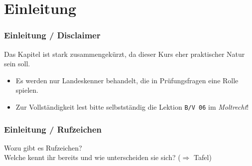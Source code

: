 

\subtitle{Betriebstechnik/Vorschriften 06: \\
          Rufzeichen - Landeskenner \\[2em]}
\date{Stand 19.11.2015}



\section{Einleitung}

\begin{frame}
    \frametitle{Einleitung / Disclaimer}

    \begin{center}
        \Large{Das Kapitel ist stark zusammengekürzt, da dieser Kurs eher
        praktischer Natur sein soll.}
    \end{center}

    \normalsize

    \begin{itemize}
        \item Es werden nur Landeskenner behandelt, die in Prüfungsfragen eine Rolle spielen.
        \item Zur Vollständigkeit lest bitte selbstständig die Lektion
              \texttt{B/V 06} im \emph{Moltrecht}!
    \end{itemize}

\end{frame}


\begin{frame}
    \frametitle{Einleitung / Rufzeichen}

    \begin{center}
        \Large{Wozu gibt es Rufzeichen?} \\[1em]
        \Large{Welche kennt ihr bereits und wie unterscheiden sie sich? ($\Rightarrow$ Tafel)}
    \end{center}

\end{frame}

